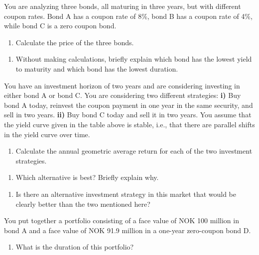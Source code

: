 \documentclass[12]{article}
\begin{document}
\noindent
You are analyzing three bonds, all maturing in three years, but with different coupon rates. Bond A has a coupon rate of 8\%, bond B has a coupon rate of 4\%, while bond C is a zero coupon bond.

\begin{enumerate}
    \item [a)] Calculate the price of the three bonds.
\end{enumerate}


\color{black}
\begin{enumerate}
    \item [b)] Without making calculations, briefly explain which bond has the lowest yield to maturity and which bond has the lowest duration.
\end{enumerate}

\noindent
\color{black}
You have an investment horizon of two years and are considering investing in either bond A or bond C. You are considering two different strategies: \textbf{i)} Buy bond A today, reinvest the coupon payment in one year in the same security, and sell in two years. \textbf{ii)} Buy bond C today and sell it in two years. You assume that the yield curve given in the table above is stable, i.e., that there are parallel shifts in the yield curve over time.

\begin{enumerate}
    \item [c)] Calculate the annual geometric average return for each of the two investment strategies.
\end{enumerate}


\color{black}
\begin{enumerate}
    \item [d)] Which alternative is best? Briefly explain why.
\end{enumerate}


\color{black}
\begin{enumerate}
    \item [e)] Is there an alternative investment strategy in this market that would be clearly better than the two mentioned here?
\end{enumerate}

\noindent
\color{black}
You put together a portfolio consisting of a face value of NOK 100 million in bond A and a face value of NOK 91.9 million in a one-year zero-coupon bond D.
\begin{enumerate}
    \item [f)] What is the duration of this portfolio?
\end{enumerate}
\end{document}
